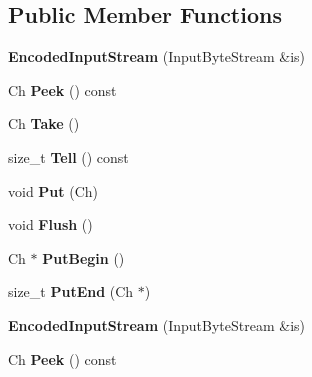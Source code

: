 \subsection*{Public Member Functions}
\begin{DoxyCompactItemize}
\item 
\mbox{\label{classEncodedInputStream_a17f8e629500f6ae71cb72d1d63bf41fd}} 
{\bfseries Encoded\+Input\+Stream} (Input\+Byte\+Stream \&is)
\item 
\mbox{\label{classEncodedInputStream_a046ab121d8dd303b9dc14d4b34940fad}} 
Ch {\bfseries Peek} () const
\item 
\mbox{\label{classEncodedInputStream_ab42cd57581bf62e42af471583e5b8377}} 
Ch {\bfseries Take} ()
\item 
\mbox{\label{classEncodedInputStream_afbe4ac0fc57fa992ba3aa5da8dc66527}} 
size\+\_\+t {\bfseries Tell} () const
\item 
\mbox{\label{classEncodedInputStream_afea36b666a44bd4adeabfcab7b68a322}} 
void {\bfseries Put} (Ch)
\item 
\mbox{\label{classEncodedInputStream_aa4415bf4b97dd01e8c3de0ad7a161724}} 
void {\bfseries Flush} ()
\item 
\mbox{\label{classEncodedInputStream_ad97f7a549a8622c61b7fb2c63fedd69b}} 
Ch $\ast$ {\bfseries Put\+Begin} ()
\item 
\mbox{\label{classEncodedInputStream_a83fe5ed281413d6005d1b324730e8bed}} 
size\+\_\+t {\bfseries Put\+End} (Ch $\ast$)
\item 
\mbox{\label{classEncodedInputStream_a17f8e629500f6ae71cb72d1d63bf41fd}} 
{\bfseries Encoded\+Input\+Stream} (Input\+Byte\+Stream \&is)
\item 
\mbox{\label{classEncodedInputStream_a046ab121d8dd303b9dc14d4b34940fad}} 
Ch {\bfseries Peek} () const
\item 

\end{DoxyCompactItemize}

